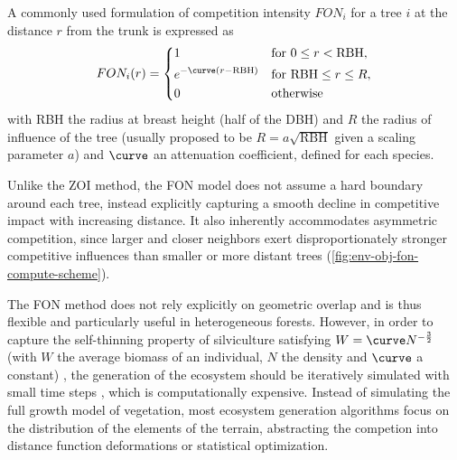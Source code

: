A commonly used formulation of competition intensity $FON_i$ for a tree $i$ at the distance $r$ from the trunk is expressed as 
\begin{align}
    FON_i(r) = \begin{dcases}
        1 & \text{for } 0 \leq r < \text{RBH}, \\
        e^{-\curve(r - \text{RBH})} & \text{for } \text{RBH} \leq r \leq R, \\
        0 & \text{otherwise}
    \end{dcases}
\end{align}
with RBH the radius at breast height (half of the DBH) and $R$ the radius of influence of the tree (usually proposed to be $R = a \sqrt{\text{RBH}}$ given a scaling parameter $a$) and $\curve$ an attenuation coefficient, defined for each species. 


Unlike the ZOI method, the FON model does not assume a hard boundary around each tree, instead explicitly capturing a smooth decline in competitive impact with increasing distance. It also inherently accommodates asymmetric competition, since larger and closer neighbors exert disproportionately stronger competitive influences than smaller or more distant trees (\cref{fig:env-obj-fon-compute-scheme}).

The FON method does not rely explicitly on geometric overlap and is thus flexible and particularly useful in heterogeneous forests. However, in order to capture the self-thinning property of silviculture \cite{Makowski2019} satisfying $ W = \curve N^{-\frac{3}{2}} $ (with $W$ the average biomass of an individual, $N$ the density and $\curve$ a constant) \cite{Westoby1984}, the generation of the ecosystem should be iteratively simulated with small time steps \cite{Alsweis2005}, which is computationally expensive. Instead of simulating the full growth model of vegetation, most ecosystem generation algorithms focus on the distribution of the elements of the terrain, abstracting the competion into distance function deformations or statistical optimization. 

